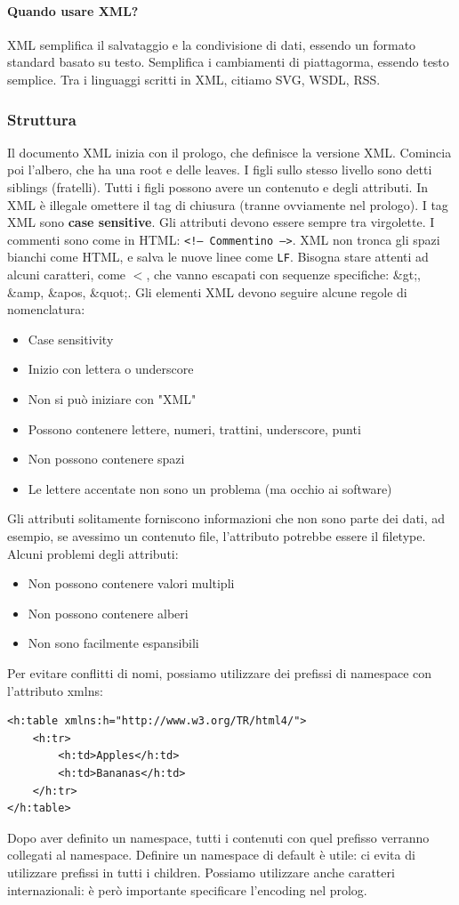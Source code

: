 \documentclass[11pt]{article}
\newcommand{\code}[1]{\texttt{#1}}
\begin{document}
\paragraph{Quando usare XML?} XML semplifica il salvataggio e la condivisione di dati, essendo un formato standard basato su testo. Semplifica i cambiamenti di piattagorma, essendo testo semplice. Tra i linguaggi scritti in XML, citiamo SVG, WSDL, RSS.
\subsubsection{Struttura}
Il documento XML inizia con il prologo, che definisce la versione XML. Comincia poi l'albero, che ha una root e delle leaves. I figli sullo stesso livello sono detti siblings (fratelli). Tutti i figli possono avere un contenuto e degli attributi. In XML è illegale omettere il tag di chiusura (tranne ovviamente nel prologo). I tag XML sono \textbf{case sensitive}. Gli attributi devono essere sempre tra virgolette. I commenti sono come in HTML: \code{<!-- Commentino -->}. XML non tronca gli spazi bianchi come HTML, e salva le nuove linee come \code{LF}. Bisogna stare attenti ad alcuni caratteri, come $<$, che vanno escapati con sequenze specifiche: \&gt;, \&amp, \&apos, \&quot;. Gli elementi XML devono seguire alcune regole di nomenclatura:
\begin{itemize}
    \item Case sensitivity
    \item Inizio con lettera o underscore
    \item Non si può iniziare con "XML"
    \item Possono contenere lettere, numeri, trattini, underscore, punti
    \item Non possono contenere spazi 
    \item Le lettere accentate non sono un problema (ma occhio ai software)
\end{itemize}
Gli attributi solitamente forniscono informazioni che non sono parte dei dati, ad esempio, se avessimo un contenuto file, l'attributo potrebbe essere il filetype. Alcuni problemi degli attributi:
\begin{itemize}
    \item Non possono contenere valori multipli
    \item Non possono contenere alberi 
    \item Non sono facilmente espansibili
\end{itemize}
Per evitare conflitti di nomi, possiamo utilizzare dei prefissi di namespace con l'attributo xmlns:
\begin{verbatim}
<h:table xmlns:h="http://www.w3.org/TR/html4/"> 
    <h:tr>
        <h:td>Apples</h:td>
        <h:td>Bananas</h:td>
    </h:tr>
</h:table>
\end{verbatim}
Dopo aver definito un namespace, tutti i contenuti con quel prefisso verranno collegati al namespace. Definire un namespace di default è utile: ci evita di utilizzare prefissi in tutti i children. 
Possiamo utilizzare anche caratteri internazionali: è però importante specificare l'encoding nel prolog. 
\end{document}
